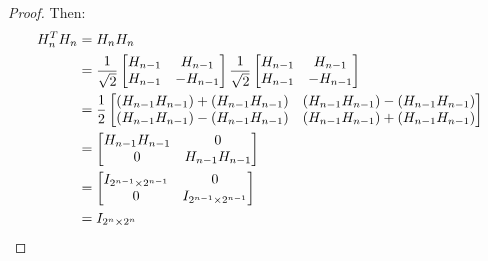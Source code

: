 \documentclass[11pt]{article}
\theoremstyle{definition}
\theoremstyle{plain}
\theoremstyle{indented-remark}
\theoremstyle{indented-proof}
\begin{document}
\begin{proof}
\noindent Then:
\begin{align}
H_{n}^{T}H_{n} &= H_{n}H_{n} \notag \\
&= \frac{1}{\sqrt{2}}
\begin{bmatrix} 
H_{n-1} & H_{n-1} \\
H_{n-1} & -H_{n-1}  
\end{bmatrix}
\frac{1}{\sqrt{2}}
\begin{bmatrix} 
H_{n-1} & H_{n-1} \\
H_{n-1} & -H_{n-1} 
\end{bmatrix} \notag \\
&= \frac{1}{2}
\begin{bmatrix} 
(H_{n-1}H_{n-1})+(H_{n-1}H_{n-1}) & (H_{n-1}H_{n-1})-(H_{n-1}H_{n-1}) \\
(H_{n-1}H_{n-1})-(H_{n-1}H_{n-1}) & (H_{n-1}H_{n-1})+(H_{n-1}H_{n-1})
\end{bmatrix}\notag \\
&= 
\begin{bmatrix} 
H_{n-1}H_{n-1} & 0 \\
0 & H_{n-1}H_{n-1} 
\end{bmatrix}\notag \\
&=
\begin{bmatrix} 
I_{2^{n-1} \times 2^{n-1}} & 0 \\
0 & I_{2^{n-1} \times 2^{n-1}} 
\end{bmatrix}\notag \\
&=
I_{2^{n} \times 2^{n}} \notag
\end{align}
\end{proof}

\newpage
\end{document}
